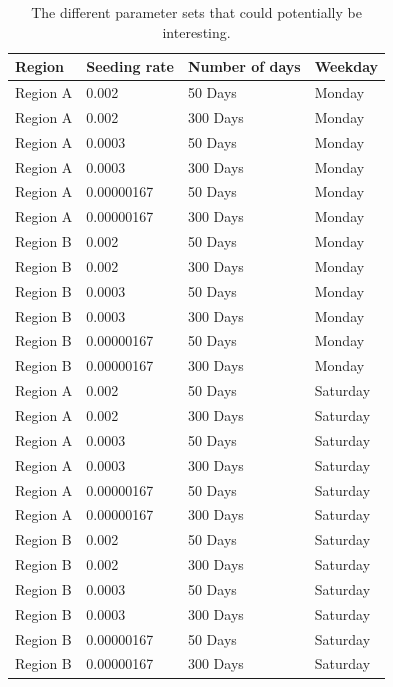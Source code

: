 \documentclass[runningheads]{llncs}
\begin{document}
\begin{table}[H]
\centering
\begin{tabular}{|l|l|l|l|}
\hline
\textbf{Region} & \textbf{Seeding rate} & \textbf{Number of days} & \textbf{Weekday} \\
\hline
Region A & 0.002 &      50 Days & Monday \\ 
 \hline
Region A & 0.002 &      300 Days & Monday \\ 
 \hline
Region A & 0.0003 &     50 Days &  Monday \\ 
 \hline
Region A & 0.0003 &     300 Days & Monday \\ 
 \hline
Region A & 0.00000167 & 50 Days &  Monday \\ 
 \hline
Region A & 0.00000167 & 300 Days & Monday \\ 
 \hline
Region B & 0.002 &      50 Days &  Monday \\ 
 \hline
Region B & 0.002 &      300 Days & Monday \\ 
 \hline
Region B & 0.0003 &     50 Days &  Monday \\ 
 \hline
Region B & 0.0003 &     300 Days & Monday \\ 
 \hline
Region B & 0.00000167 & 50 Days &  Monday \\ 
 \hline
Region B & 0.00000167 & 300 Days & Monday \\ 
 \hline
Region A & 0.002 &      50 Days & Saturday \\ 
 \hline
Region A & 0.002 &      300 Days & Saturday \\ 
 \hline
Region A & 0.0003 &     50 Days &  Saturday \\ 
 \hline
Region A & 0.0003 &     300 Days & Saturday \\ 
 \hline
Region A & 0.00000167 & 50 Days &  Saturday \\ 
 \hline
Region A & 0.00000167 & 300 Days & Saturday \\ 
 \hline
Region B & 0.002 &      50 Days &  Saturday \\ 
 \hline
Region B & 0.002 &      300 Days & Saturday \\ 
 \hline
Region B & 0.0003 &     50 Days &  Saturday \\ 
 \hline
Region B & 0.0003 &     300 Days & Saturday \\ 
 \hline
Region B & 0.00000167 & 50 Days &  Saturday \\ 
 \hline
Region B & 0.00000167 & 300 Days & Saturday \\ 
 \hline
\end{tabular}
\caption{The different parameter sets that could potentially be interesting.}
\label{2_1_regionDiff_tableParamSets_full}
\end{table}
\end{document}

